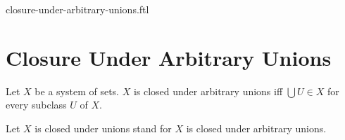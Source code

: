 \documentclass{naproche-library}
\begin{document}
\begin{smodule}{closure-under-arbitrary-unions.ftl}

  \section*{Closure Under Arbitrary Unions}

  \begin{definition}[forthel,id=FOUNDATIONS_14_3959378992431104,printid]
    Let $X$ be a system of sets.
    $X$ is closed under arbitrary unions iff $\bigcup U \in X$ for every  subclass $U$ of $X$.

    Let $X$ is closed under unions stand for $X$ is closed under arbitrary unions.
  \end{definition}
\end{smodule}
\end{document}
